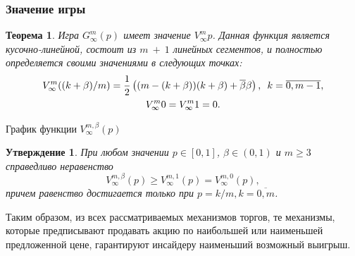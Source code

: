 \documentclass[12pt]{beamer}
\newcommand{\Co}{\beta}
\newcommand{\DCo}{\overline{\beta}}
\newtheorem{thm}{Теорема}[section]
\newtheorem{prop}{Утверждение}[section]
\begin{document}
\begin{frame}
  \frametitle{Значение игры}

  \begin{thm}
    Игра $G^m_\infty(p)$ имеет значение $V^m_\infty{p}$. Данная функция является кусочно-линейной, состоит из $m~+~1$ линейных сегментов, и полностью определяется своими значениями в следующих точках:
    \begin{gather*}
      V^m_\infty((k+\Co)/m) = \frac{1}{2} \left( (m - (k + \Co))(k + \Co) + \DCo\Co
      \right),\enskip
      k = \overline{0, m - 1},\\
      V^m_\infty{0} = V^m_\infty{1} = 0.
    \end{gather*}
  \end{thm}
\end{frame}

\begin{frame}
  \begin{figure}[thb]
    \centering
  \end{figure}

  \begin{center}
    График функции $V^{m,\Co}_\infty(p)$
  \end{center}
\end{frame}

\begin{frame}
  \begin{prop}
    При любом значении $p \in [0,1]$, $\Co \in (0,1)$ и $m \geq 3$ справедливо неравенство
    \begin{equation*}
      V^{m, \Co}_\infty(p) \geq V^{m,1}_\infty(p) = V^{m,0}_\infty(p),
    \end{equation*}
    причем равенство достигается только при $p = k/m, k = \overline{0,m}$.
  \end{prop}

  Таким образом, из всех рассматриваемых механизмов торгов, те механизмы, которые предписывают продавать акцию по наибольшей или наименьшей предложенной цене, гарантируют инсайдеру наименьший возможный выигрыш.
\end{frame}
\end{document}
